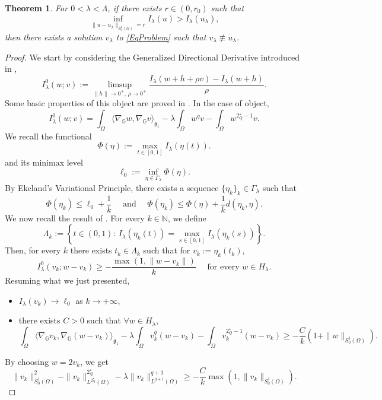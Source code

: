 \documentclass[11pt]{amsart}
\numberwithin{equation}{section} %
\newtheorem{teo}{Theorem}[section]
\theoremstyle{definition}
\def\G{\mathbb{G}}
\begin{document}
\begin{teo}\label{thm:casob}
	For $0<\lambda<\Lambda$, if there exists $r\in (0,r_0)$ such that 
	\[
	\inf_{\|u-u_\lambda\|_{S_{0}^{1}(\Omega)}=r}I_\lambda(u)>I_\lambda(u_\lambda),
	\]
	then there exists a solution $v_\lambda$ to \eqref{EqProblem}
	such that $v_\lambda \not\equiv u_\lambda$.\newline
\end{teo}
\begin{proof}
We start by considering the Generalized Directional Derivative
introduced in \cite{BadTar}, 
\[
I^0_\lambda(w;v):=\limsup_{\|h\|\to0^+,\, \rho\to0^+}\frac{I_\lambda(w+h+\rho v)-I_\lambda(w+h)}{\rho}.
\]
Some basic properties of this object are proved in \cite[Appendix]{BiGaVe}.
In the case of object,
\[
I_\lambda^0(w;v)=\int_\Omega\langle \nabla_\G w,\nabla_\G v\rangle_{\mathfrak{g}_1}-\lambda\int_\Omega w^{q}v-\int_\Omega w^{2^\star_Q-1}v.
\]
We recall the functional
\[
\Phi(\eta):= \max_{t\in [0,1]}I_\lambda(\eta(t)).
\]
and its minimax level
\[
\ell_0:=\inf_{\eta\in\Gamma_\lambda}\Phi(\eta).
\]
By Ekeland's Variational Principle, there exists
a sequence $\{\eta_k\}_k\in \Gamma_\lambda$
such that
$$\Phi(\eta_k)\leq \ell_0+\frac{1}{k} \quad \textrm{ and } \quad \Phi(\eta_k)\leq \Phi(\eta)+\frac{1}{k}d(\eta_k,\eta).$$
We now recall the result of \cite[Lemma A.2]{BiGaVe}.
For every $k\in \mathbb{N}$, we define 
\[
\Lambda_k:=\left\{t\in(0,1):\ I_\lambda(\eta_k(t))=\max_{s \in [0,1]}I_\lambda(\eta_k(s))\right\}.
\]
Then, for every $k$ there exists $t_k\in \Lambda_k$ such that 
for $v_k:=\eta_k(t_k)$,
\begin{equation}\label{lemmaimp}
	I^0_\lambda(v_k;w-v_k)\geq-\frac{\max(1,\|w-v_k\|)}{k}\quad\textrm{ for every } w\in H_\lambda.
\end{equation}
Resuming what we just presented,
\begin{itemize}
	\item $I_\lambda(v_k)\to\ell_0$ as $k\to+\infty$,
	\item there exists $C>0$ such that $\forall w\in H_\lambda$,
	\begin{equation}\label{eq:badtarfin}
		\int_\Omega\langle \nabla_\G v_k,\nabla_\G(w-v_k)\rangle_{\mathfrak{g}_{1}} -\lambda\int_\Omega v_k^{q}(w-v_k)-\int_\Omega v_k^{2^\star_Q-1}(w-v_k)\geq
		-\frac{C}{k}(1+\|w\|_{S^{1}_{0}(\Omega)}).
	\end{equation}
\end{itemize}
By choosing $w=2v_k$,
we get
\begin{equation}\label{eq:ultima}
\| v_k\|^2_{{S_0^1(\Omega)}}-\|v_k\|^{2^\star_Q}_{L^{2^\star_Q}(\Omega)}-\lambda \|v_k\|^{q+1}_{L^{q+1}(\Omega)}\geq-\frac{C}{k}\max(1,\|v_k\|_{{S_0^1(\Omega)}}).
\end{equation}


\end{proof}
\end{document}
